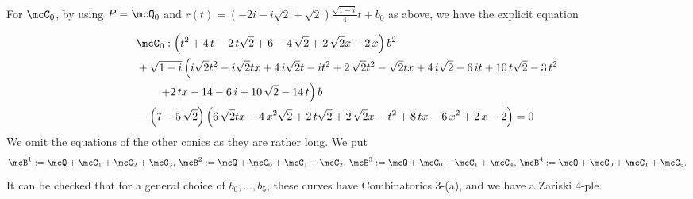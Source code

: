 \begin{exmple}[{\bf Combinatorics  3-(a)}]
For $\mcC_0$, by using $P=\mcQ_0$ and $r(t)=\left(-2i-i\sqrt{2}+\sqrt{2}\right)\frac{\sqrt{1-i}}{4} t+b_0$ as above, we have the explicit equation

\begin{align*}
&\mcC_0: \left( {t}^{2}+4\,t-2\,t\sqrt {2}+6-4\,\sqrt {2}+2\,\sqrt {2}x-2\,x
 \right) {b}^{2}\\
 &+\sqrt {1-i} \left( i\sqrt {2}{t}^{2}-i\sqrt {2}tx+4\,
i\sqrt {2}t-i{t}^{2}+2\,\sqrt {2}{t}^{2}-\sqrt {2}tx+4\,i\sqrt {2}-6\,
it+10\,t\sqrt {2}-3\,{t}^{2} \right.\\
&\left.\quad\quad+2\,tx-14-6\,i+10\,\sqrt {2}-14\,t
 \right)b \\
 &-\left( 7-5\,\sqrt {2} \right)  \left( 6\,\sqrt {2}tx-4\,{x}^{2}
\sqrt {2}+2\,t\sqrt {2}+2\,\sqrt {2}x-{t}^{2}+8\,tx-6\,{x}^{2}+2\,x-2
 \right) 
=0
\end{align*}
We omit the equations of the other conics as they are rather long. 
We put 
\[
\mcB^1  :=  \mcQ + \mcC_1 + \mcC_2 + \mcC_3,  \,\mcB^2  :=   \mcQ + \mcC_0 + \mcC_1 + \mcC_2,\, 
\mcB^3  :=  \mcQ + \mcC_0 + \mcC_1 + \mcC_4, \, \mcB^4  :=   \mcQ + \mcC_0 + \mcC_1 + \mcC_5.
\]
It can be checked that for a general choice of $b_0,\ldots, b_5$, 
these curves  have Combinatorics 3-(a), and we have a Zariski 4-ple.

\end{exmple}

